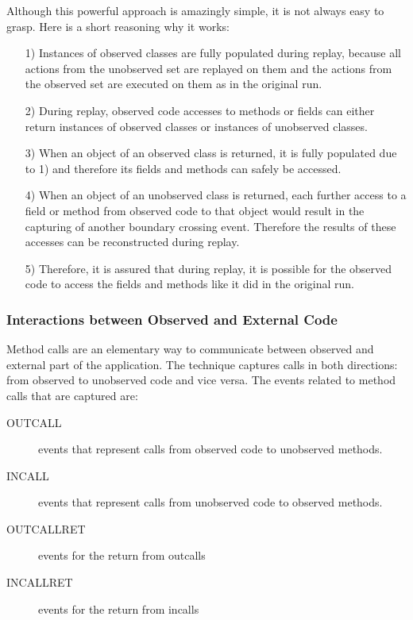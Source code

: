 Although this powerful approach is amazingly simple, it is not always easy to grasp. Here is a short reasoning why it works:
\begin{enumerate}
  \item [1)] Instances of observed classes are fully populated during replay, because all actions from the unobserved set are replayed on them and the actions from the observed set are executed on them as in the original run.
  \item [2)] During replay, observed code accesses to methods or fields can either return instances of observed classes or instances of unobserved classes.
  \item [3)] When an object of an observed class is returned, it is fully populated due to 1) and therefore its fields and methods can safely be accessed.
  \item [4)] When an object of an unobserved class is returned, each further access to a field or method from observed code to that object would result in the capturing of another boundary crossing event. Therefore the results of these accesses can be reconstructed during replay.
  \item [5)] Therefore, it is assured that during replay, it is possible for the observed code to access the fields and methods like it did in the original run.
\end{enumerate}



\subsubsection {Interactions between Observed and External Code}
Method calls are an elementary way to communicate between observed and external part of the application. The technique captures calls in both directions: from observed to unobserved code and vice versa. The events related to method calls that are captured are:

\begin{description}
 \item  [OUTCALL] events that represent calls from observed code to unobserved methods.
 \item [INCALL] events that represent calls from unobserved code to observed methods.
 \item [OUTCALLRET] events for the return from outcalls
 \item [INCALLRET] events for the return from incalls
\end{description}

